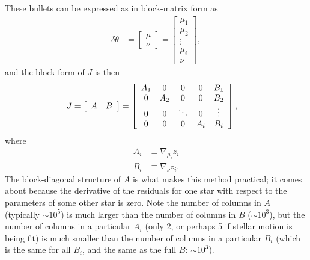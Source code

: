 These bullets can be expressed as in block-matrix form as
\begin{align}
    \delta\theta &= \left[
        \begin{array}{ c }
            \mu \\
            \nu
        \end{array}
    \right]
    =
    \left[
        \begin{array}{ c }
            \mu_1 \\
            \mu_2 \\
            \vdots \\
            \mu_i \\
            \nu
        \end{array}
    \right],
\end{align}
and the block form of $J$ is then
\begin{align}
    J &= \left[
        \begin{array}{ c c }
            A & B
        \end{array}
    \right]
    = \left[
        \begin{array}{ c c c c c }
            A_1 & 0 & 0 & 0 & B_1 \\
            0 & A_2 & 0 & 0 & B_2 \\
            0 & 0 & \ddots & 0 & \vdots \\
            0 & 0 & 0 & A_i & B_i
        \end{array}
    \right],
\end{align}
where
\begin{align}
    A_i &\equiv \nabla_{\mu_i} z_i \\
    B_i &\equiv \nabla_{\nu} z_i.
\end{align}
The block-diagonal structure of $A$ is what makes this method practical; it comes about because the derivative of the residuals for one star with respect to the parameters of some other star is zero.
Note the number of columns in $A$ (typically $\sim 10^5$) is much larger than the number of columns in $B$ ($\sim 10^3$), but the number of columns in a particular $A_i$ (only 2, or perhaps 5 if stellar motion is being fit) is much smaller than the number of columns in a particular $B_i$ (which is the same for all $B_i$, and the same as the full $B$: $\sim 10^3$).

